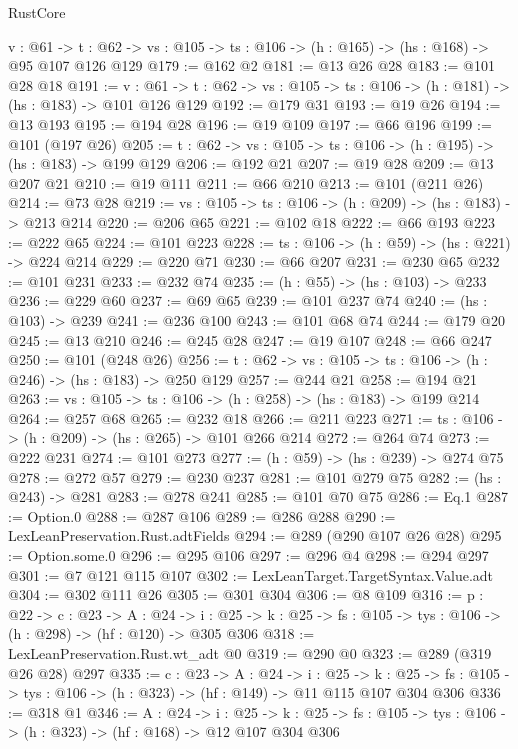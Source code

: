 \begin{lexlean}{RustCore}
\begin{coremodule}
  {v : @61} ->
  {t : @62} -> {vs : @105} -> {ts : @106} -> (h : @165) -> (hs : @168) -> @95 @107 @126 @129
@179 := @162 @2
@181 := @13 @26 @28
@183 := @101 @28 @18
@191 := {v : @61} ->
  {t : @62} -> {vs : @105} -> {ts : @106} -> (h : @181) -> (hs : @183) -> @101 @126 @129
@192 := @179 @31
@193 := @19 @26
@194 := @13 @193
@195 := @194 @28
@196 := @19 @109
@197 := @66 @196
@199 := @101 (@197 @26)
@205 := {t : @62} -> {vs : @105} -> {ts : @106} -> (h : @195) -> (hs : @183) -> @199 @129
@206 := @192 @21
@207 := @19 @28
@209 := @13 @207 @21
@210 := @19 @111
@211 := @66 @210
@213 := @101 (@211 @26)
@214 := @73 @28
@219 := {vs : @105} -> {ts : @106} -> (h : @209) -> (hs : @183) -> @213 @214
@220 := @206 @65
@221 := @102 @18
@222 := @66 @193
@223 := @222 @65
@224 := @101 @223
@228 := {ts : @106} -> (h : @59) -> (hs : @221) -> @224 @214
@229 := @220 @71
@230 := @66 @207
@231 := @230 @65
@232 := @101 @231
@233 := @232 @74
@235 := (h : @55) -> (hs : @103) -> @233
@236 := @229 @60
@237 := @69 @65
@239 := @101 @237 @74
@240 := (hs : @103) -> @239
@241 := @236 @100
@243 := @101 @68 @74
@244 := @179 @20
@245 := @13 @210
@246 := @245 @28
@247 := @19 @107
@248 := @66 @247
@250 := @101 (@248 @26)
@256 := {t : @62} -> {vs : @105} -> {ts : @106} -> (h : @246) -> (hs : @183) -> @250 @129
@257 := @244 @21
@258 := @194 @21
@263 := {vs : @105} -> {ts : @106} -> (h : @258) -> (hs : @183) -> @199 @214
@264 := @257 @68
@265 := @232 @18
@266 := @211 @223
@271 := {ts : @106} -> (h : @209) -> (hs : @265) -> @101 @266 @214
@272 := @264 @74
@273 := @222 @231
@274 := @101 @273
@277 := (h : @59) -> (hs : @239) -> @274 @75
@278 := @272 @57
@279 := @230 @237
@281 := @101 @279 @75
@282 := (hs : @243) -> @281
@283 := @278 @241
@285 := @101 @70 @75
@286 := Eq.{1}
@287 := Option.{0}
@288 := @287 @106
@289 := @286 @288
@290 := LexLeanPreservation.Rust.adtFields
@294 := @289 (@290 @107 @26 @28)
@295 := Option.some.{0}
@296 := @295 @106
@297 := @296 @4
@298 := @294 @297
@301 := @7 @121 @115 @107
@302 := LexLeanTarget.TargetSyntax.Value.adt
@304 := @302 @111 @26
@305 := @301 @304
@306 := @8 @109
@316 := {p : @22} ->
  {c : @23} ->
  {A : @24} ->
  {i : @25} -> {k : @25} -> {fs : @105} -> {tys : @106} -> (h : @298) -> (hf : @120) -> @305 @306
@318 := LexLeanPreservation.Rust.wt_adt @0
@319 := @290 @0
@323 := @289 (@319 @26 @28) @297
@335 := {c : @23} ->
  {A : @24} ->
  {i : @25} ->
  {k : @25} -> {fs : @105} -> {tys : @106} -> (h : @323) -> (hf : @149) -> @11 @115 @107 @304 @306
@336 := @318 @1
@346 := {A : @24} ->
  {i : @25} ->
  {k : @25} -> {fs : @105} -> {tys : @106} -> (h : @323) -> (hf : @168) -> @12 @107 @304 @306

\end{coremodule}
\end{lexlean}
